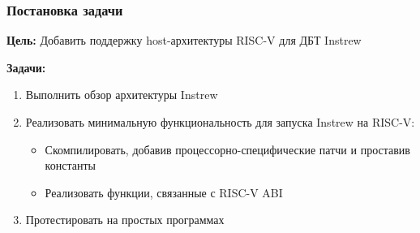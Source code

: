 \documentclass{beamer}
\begin{document}
\begin{frame}
  \frametitle{Постановка задачи}
  \textbf{Цель:} Добавить поддержку host-архитектуры RISC-V для ДБТ Instrew

  \vspace{5mm}
  \textbf{Задачи:}
  \begin{enumerate}
    \item Выполнить обзор архитектуры Instrew
    \item Реализовать минимальную функциональность для запуска Instrew
          на RISC-V:
          \begin{itemize}
            \item Скомпилировать, добавив процессорно-специфические патчи и проставив константы
            \item Реализовать функции, связанные с RISC-V ABI
          \end{itemize}
    \item Протестировать на простых программах
  \end{enumerate}
\end{frame}




\end{document}
